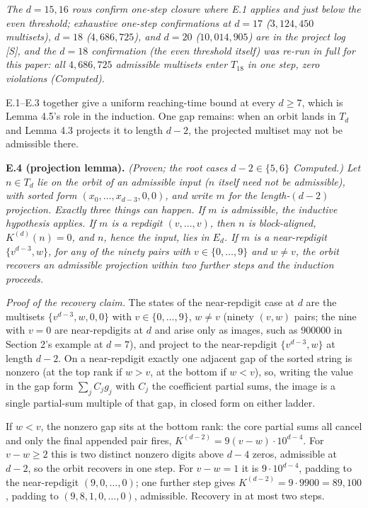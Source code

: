 \documentclass[11pt,letterpaper]{article}
\theoremstyle{paperstyle}
\theoremstyle{paperstyledef}
\theoremstyle{paperstylerem}
\begin{document}
\emph{The \(d = 15, 16\) rows confirm one-step closure where E.1 applies and just below the even threshold; exhaustive one-step confirmations at \(d = 17\) (\(3{,}124{,}450\) multisets), \(d = 18\) (\(4{,}686{,}725\)), and \(d = 20\) (\(10{,}014{,}905\)) are in the project log {[}S{]}, and the \(d = 18\) confirmation (the even threshold itself) was re-run in full for this paper: all \(4{,}686{,}725\) admissible multisets enter \(T_{18}\) in one step, zero violations (Computed).}

E.1--E.3 together give a uniform reaching-time bound at every \(d \geq 7\), which is Lemma 4.5's role in the induction. One gap remains: when an orbit lands in \(T_d\) and Lemma 4.3 projects it to length \(d - 2\), the projected multiset may not be admissible there.

\textbf{E.4 (projection lemma).} \emph{(Proven; the root cases \(d - 2 \in \{5, 6\}\) Computed.) Let \(n \in T_d\) lie on the orbit of an admissible input (\(n\) itself need not be admissible), with sorted form \((x_0, \dots, x_{d-3}, 0, 0)\), and write \(m\) for the length-\((d-2)\) projection. Exactly three things can happen. If \(m\) is admissible, the inductive hypothesis applies. If \(m\) is a repdigit \((v, \dots, v)\), then \(n\) is block-aligned, \(K^{(d)}(n) = 0\), and \(n\), hence the input, lies in \(E_d\). If \(m\) is a near-repdigit \(\{v^{d-3}, w\}\), for any of the ninety pairs with \(v \in \{0, \dots, 9\}\) and \(w \neq v\), the orbit recovers an admissible projection within two further steps and the induction proceeds.}

\emph{Proof of the recovery claim.} The states of the near-repdigit case at \(d\) are the multisets \(\{v^{d-3}, w, 0, 0\}\) with \(v \in \{0, \dots, 9\}\), \(w \neq v\) (ninety \((v, w)\) pairs; the nine with \(v = 0\) are near-repdigits at \(d\) and arise only as images, such as \(900000\) in Section 2's example at \(d = 7\)), and project to the near-repdigit \(\{v^{d-3}, w\}\) at length \(d-2\). On a near-repdigit exactly one adjacent gap of the sorted string is nonzero (at the top rank if \(w > v\), at the bottom if \(w < v\)), so, writing the value in the gap form \(\sum_j C_j g_j\) with \(C_j\) the coefficient partial sums, the image is a single partial-sum multiple of that gap, in closed form on either ladder.

If \(w < v\), the nonzero gap sits at the bottom rank: the core partial sums all cancel and only the final appended pair fires, \(K^{(d-2)} = 9(v-w)\cdot 10^{d-4}\). For \(v - w \geq 2\) this is two distinct nonzero digits above \(d - 4\) zeros, admissible at \(d-2\), so the orbit recovers in one step. For \(v - w = 1\) it is \(9 \cdot 10^{d-4}\), padding to the near-repdigit \((9, 0, \dots, 0)\); one further step gives \(K^{(d-2)} = 9 \cdot 9900 = 89{,}100\), padding to \((9, 8, 1, 0, \dots, 0)\), admissible. Recovery in at most two steps.
\end{document}
